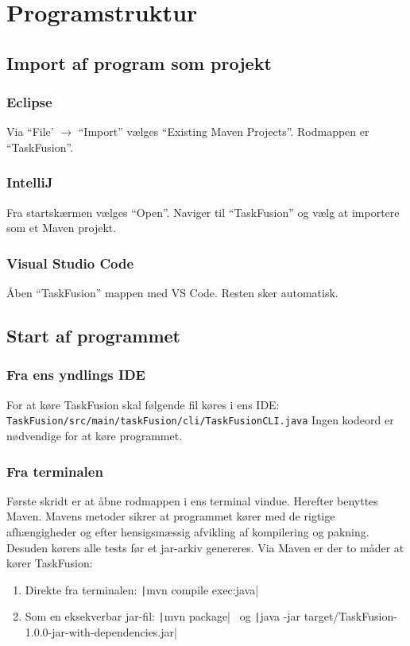 \section{Programstruktur}\label{sec:struct}
\subsection{Import af program som projekt}
\subsubsection{Eclipse}
Via ``File' \(\rightarrow\) ``Import'' vælges ``Existing Maven Projects''. Rodmappen er ``TaskFusion''.
\subsubsection{IntelliJ}
Fra startskærmen vælges ``Open''. Naviger til ``TaskFusion'' og vælg at importere som et Maven projekt.
\subsubsection{Visual Studio Code}
Åben ``TaskFusion'' mappen med VS Code. Resten sker automatisk.
\subsection{Start af programmet}
\subsubsection{Fra ens yndlings IDE}
For at køre TaskFusion skal følgende fil køres i ens IDE:\newline
\texttt{TaskFusion/src/main/taskFusion/cli/TaskFusionCLI.java}\newline
Ingen kodeord er nødvendige for at køre programmet.
\subsubsection{Fra terminalen}
Første skridt er at åbne rodmappen i ens terminal vindue. Herefter benyttes Maven. Mavens metoder sikrer at programmet kører med de rigtige afhængigheder og efter hensigsmæssig afvikling af kompilering og pakning. Desuden kørers alle tests før et jar-arkiv genereres. Via Maven er der to måder at kører TaskFusion:
\begin{enumerate}
    \item Direkte fra terminalen: \texttt|mvn compile exec:java|
    \item Som en eksekverbar jar-fil: \texttt|mvn package| \ og \newline \texttt|java -jar target/TaskFusion-1.0.0-jar-with-dependencies.jar|
\end{enumerate}

